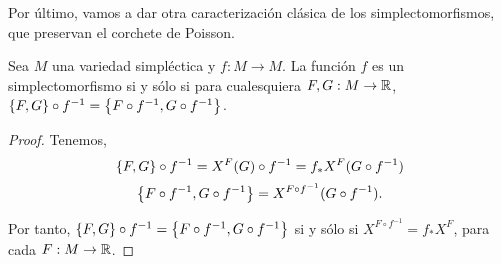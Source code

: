 Por último, vamos a dar otra caracterización clásica de los simplectomorfismos, que preservan el corchete de Poisson.
\begin{prop}
  Sea $M$ una variedad simpléctica y $f:M\rightarrow M$. La función $f$ es un simplectomorfismo si y sólo si para cualesquiera $F,G: M \rightarrow \mathbb{R}$, $\left\lbrace F,G\right\rbrace \circ f^{-1}=\left\lbrace F\circ f^{-1},G \circ f^{-1}\right\rbrace$.
\end{prop}
\begin{proof}\leavevmode
  Tenemos,
  \begin{equation*}
    \left\lbrace F,G\right\rbrace \circ f^{-1} = X^{F}(G) \circ f^{-1} = f_* X^F (G \circ f^{-1})
  \end{equation*}
  \begin{equation*}
    \left\lbrace F\circ f^{-1},G \circ f^{-1}\right\rbrace = X^{F\circ f^{-1}}(G \circ f^{-1}).
  \end{equation*}

  Por tanto, $\left\lbrace F,G\right\rbrace \circ f^{-1}=\left\lbrace F\circ f^{-1},G \circ f^{-1}\right\rbrace$ si y sólo si $X^{F \circ f^{-1}}= f_* X^{F}$, para cada $F: M \rightarrow \mathbb{R}$.
\end{proof}

